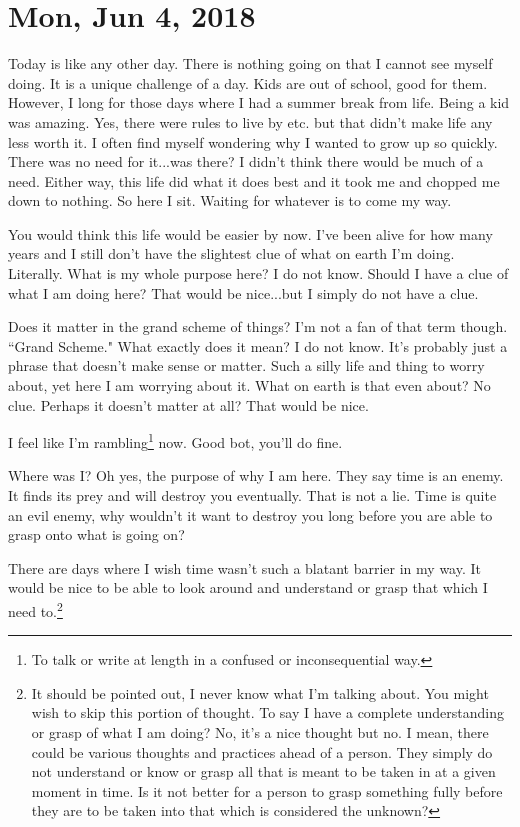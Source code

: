 \section{Mon, Jun 4, 2018}

Today is like any other day. There is nothing going on that I cannot see myself
doing. It is a unique challenge of a day. Kids are out of school, good for them.
However, I long for those days where I had a summer break from life. Being a kid
was amazing. Yes, there were rules to live by etc. but that didn't make life any
less worth it. I often find myself wondering why I wanted to grow up so quickly.
There was no need for it...was there? I didn't think there would be much of a
need. Either way, this life did what it does best and it took me and chopped me
down to nothing. So here I sit. Waiting for whatever is to come my way.

You would think this life would be easier by now. I've been alive for how many
years and I still don't have the slightest clue of what on earth I'm doing.
Literally. What is my whole purpose here? I do not know. Should I have a clue of
what I am doing here? That would be nice...but I simply do not have a clue.

Does it matter in the grand scheme of things? I'm not a fan of that term though.
``Grand Scheme." What exactly does it mean? I do not know. It's probably just a
phrase that doesn't make sense or matter. Such a silly life and thing to worry
about, yet here I am worrying about it. What on earth is that even about? No
clue. Perhaps it doesn't matter at all? That would be nice.

I feel like I'm rambling\footnote{To talk or write at length in a confused or 
inconsequential way.} now. Good bot, you'll do fine.

Where was I? Oh yes, the purpose of why I am here. They say time is an enemy. It
finds its prey and will destroy you eventually. That is not a lie. Time is quite
an evil enemy, why wouldn't it want to destroy you long before you are able to
grasp onto what is going on?

There are days where I wish time wasn't such a blatant barrier in my way. It
would be nice to be able to look around and understand or grasp that which I
need to.\footnote{It should be pointed out, I never know what I'm talking about. 
You might wish to skip this portion of thought. To say I have a complete 
understanding or grasp of what I am doing? No, it's a nice thought but no. I 
mean, there could be various thoughts and practices ahead of a person. They 
simply do not understand or know or grasp all that is meant to be taken in
at a given moment in time. Is it not better for a person to grasp something 
fully before they are to be taken into that which is considered the unknown?}

